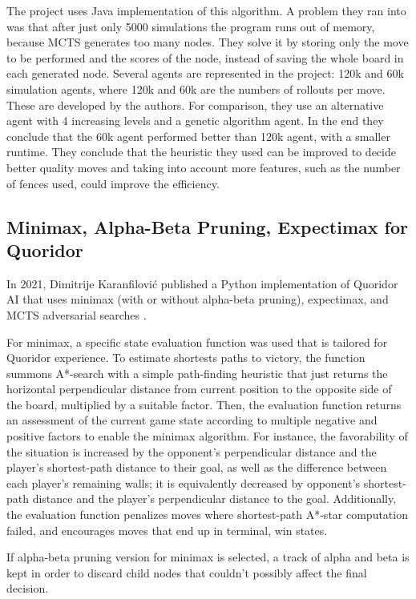 \documentclass{article}
\begin{document}
The project uses Java implementation of this algorithm. A problem they ran into was that after just only 5000 simulations the program runs out of memory, because MCTS generates too many nodes. They solve it by storing only the move to be performed and the scores of the node, instead of saving the whole board in each generated node. Several agents are represented in the project: 120k and 60k simulation agents, where 120k and 60k are the numbers of rollouts per move. These are developed by the authors. For comparison, they use an alternative agent with 4 increasing levels and a genetic algorithm agent. In the end they conclude that the 60k agent performed better than 120k agent, with 	a smaller runtime. They conclude that the heuristic they used can be improved to decide better quality moves and taking into account more features, such as the number of fences used, could improve the efficiency.


\subsection{Minimax, Alpha-Beta Pruning, Expectimax for Quoridor} \indent

In 2021, Dimitrije Karanfilović published a Python implementation of Quoridor AI that uses minimax (with or without alpha-beta pruning), expectimax, and MCTS adversarial searches \cite{python_but_worse}.

For minimax, a specific state evaluation function was used that is tailored for Quoridor experience. To estimate shortests paths to victory, the function summons A*-search with a simple path-finding heuristic that just returns the horizontal perpendicular distance from current position to the opposite side of the board, multiplied by a suitable factor. Then, the evaluation function returns an assessment of the current game state according to multiple negative and positive factors to enable the minimax algorithm. For instance, the favorability of the situation is increased by the opponent’s perpendicular distance and the player’s shortest-path distance to their goal, as well as the difference between each player’s remaining walls; it is equivalently decreased by opponent’s shortest-path distance and the player’s perpendicular distance to the goal. Additionally, the evaluation function penalizes moves where shortest-path A*-star computation failed, and encourages moves that end up in terminal, win states. 

If alpha-beta pruning version for minimax is selected, a track of alpha and beta is kept in order to discard child nodes that couldn’t possibly affect the final decision.
\end{document}
